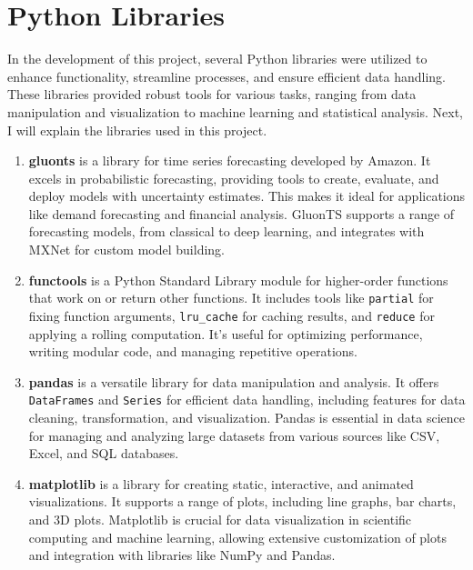 \section{Python Libraries}

In the development of this project, several Python libraries were utilized to enhance functionality, streamline processes, and ensure efficient data handling. These libraries provided robust tools for various tasks, ranging from data manipulation and visualization to machine learning and statistical analysis. Next, I will explain the libraries used in this project.

\begin{enumerate}
    \item \textbf{gluonts} is a library for time series forecasting developed by Amazon. It excels in probabilistic forecasting, providing tools to create, evaluate, and deploy models with uncertainty estimates. This makes it ideal for applications like demand forecasting and financial analysis. GluonTS supports a range of forecasting models, from classical to deep learning, and integrates with MXNet for custom model building.
    
    \item \textbf{functools} is a Python Standard Library module for higher-order functions that work on or return other functions. It includes tools like \texttt{partial} for fixing function arguments, \texttt{lru\_cache} for caching results, and \texttt{reduce} for applying a rolling computation. It's useful for optimizing performance, writing modular code, and managing repetitive operations.
    
    \item \textbf{pandas} is a versatile library for data manipulation and analysis. It offers \texttt{DataFrames} and \texttt{Series} for efficient data handling, including features for data cleaning, transformation, and visualization. Pandas is essential in data science for managing and analyzing large datasets from various sources like CSV, Excel, and SQL databases.
    
    \item \textbf{matplotlib} is a library for creating static, interactive, and animated visualizations. It supports a range of plots, including line graphs, bar charts, and 3D plots. Matplotlib is crucial for data visualization in scientific computing and machine learning, allowing extensive customization of plots and integration with libraries like NumPy and Pandas.
    

\end{enumerate}
